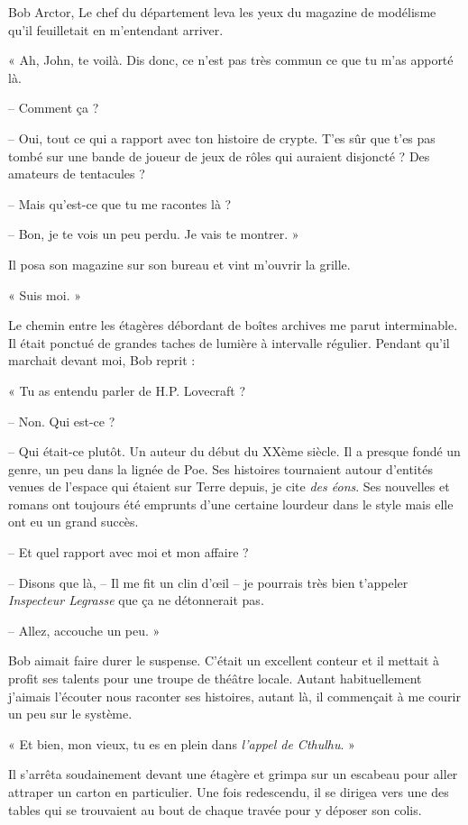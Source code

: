 Bob Arctor, Le chef du département leva les yeux du magazine de modélisme qu'il feuilletait en m'entendant arriver.

« Ah, John, te voilà. Dis donc, ce n'est pas très commun ce que tu m'as apporté là.

-- Comment ça ?

-- Oui, tout ce qui a rapport avec ton histoire de crypte. T'es sûr que t'es pas tombé sur une bande de joueur de jeux
de rôles qui auraient disjoncté ? Des amateurs de tentacules ?

-- Mais qu'est-ce que tu me racontes là ?

-- Bon, je te vois un peu perdu. Je vais te montrer. »

Il posa son magazine sur son bureau et vint m'ouvrir la grille.

« Suis moi. »

Le chemin entre les étagères débordant de boîtes archives me parut interminable. Il était ponctué de grandes taches de
lumière à intervalle régulier. Pendant qu'il marchait devant moi, Bob reprit :

« Tu as entendu parler de H.P. Lovecraft ?

-- Non. Qui est-ce ?

-- Qui était-ce plutôt. Un auteur du début du XXème siècle. Il a presque fondé un genre, un peu dans la lignée de Poe.
Ses histoires tournaient autour d'entités venues de l'espace qui étaient sur Terre depuis, je cite \emph{des éons}. Ses
nouvelles et romans ont toujours été emprunts d'une certaine lourdeur dans le style mais elle ont eu un grand succès.

-- Et quel rapport avec moi et mon affaire ?

-- Disons que là, -- Il me fit un clin d'œil -- je pourrais très bien t'appeler \emph{Inspecteur Legrasse} que ça ne 
détonnerait pas.

-- Allez, accouche un peu. »

Bob aimait faire durer le suspense. C'était un excellent conteur et il mettait à profit ses talents pour une troupe de
théâtre locale. Autant habituellement j'aimais l'écouter nous raconter ses histoires, autant là, il commençait à me
courir un peu sur le système.

« Et bien, mon vieux, tu es en plein dans \emph{l'appel de Cthulhu}. »

Il s'arrêta soudainement devant une étagère et grimpa sur un escabeau pour aller attraper un carton en particulier. Une
fois redescendu, il se dirigea vers une des tables qui se trouvaient au bout de chaque travée pour y déposer son colis.

